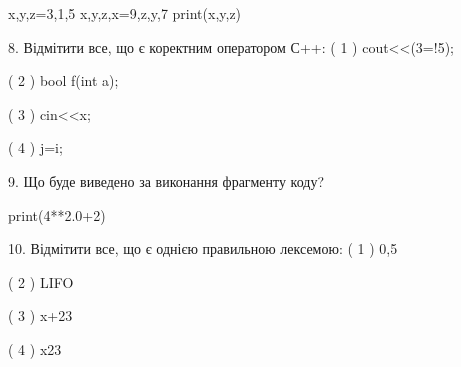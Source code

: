 \documentclass[11pt]{article}
\begin{document}
x,y,z=3,1,5
x,y,z,x=9,z,y,7
print(x,y,z)
\vspace{5mm}

8. %
Відмітити все, що є коректним оператором С++:
( 1 ) cout<<(3=!5);

( 2 ) bool f(int a);

( 3 ) cin<<x;

( 4 ) j=i;
\vspace{5mm}

9. Що буде виведено за виконання фрагменту коду?

print(4**2.0+2)
\vspace{5mm}

10. %
Відмітити все, що є однією правильною лексемою:
( 1 ) 0,5

( 2 ) LIFO

( 3 ) x+23

( 4 ) x23
\vspace{5mm}

\newpage
\end{document}
